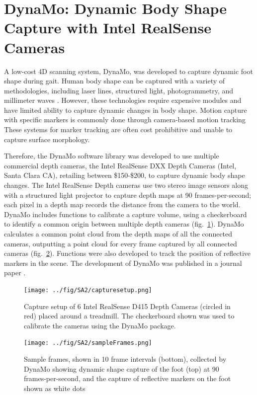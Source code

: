\documentclass[defaultstyle,11pt]{comps}
\begin{document}
\hypertarget{dynamo-dynamic-body-shape-capture-with-intel-realsense-cameras}{%
\section{DynaMo: Dynamic Body Shape Capture with Intel RealSense Cameras}\label{dynamo-dynamic-body-shape-capture-with-intel-realsense-cameras}}

A low-cost 4D scanning system, DynaMo, was developed to capture dynamic foot shape during gait.
Human body shape can be captured with a variety of methodologies, including laser lines, structured light, photogrammetry, and millimeter waves \citep{Daanen2013}.
However, these technologies require expensive modules and have limited ability to capture dynamic changes in body shape.
Motion capture with specific markers is commonly done through camera-based motion tracking \citep{Windolf2008}
These systems for marker tracking are often cost prohibitive and unable to capture surface morphology.

Therefore, the DynaMo software library was developed to use multiple commercial depth cameras, the Intel RealSense DXX Depth Cameras (Intel, Santa Clara CA), retailing between \$150-\$200, to capture dynamic body shape changes.
The Intel RealSense Depth cameras use two stereo image sensors along with a structured light projector to capture depth maps at 90 frames-per-second; each pixel in a depth map records the distance from the camera to the world.
DynaMo includes functions to calibrate a capture volume, using a checkerboard to identify a common origin between multiple depth cameras (fig.~\ref{fig:testSetup}).
DynaMo calculates a common point cloud from the depth maps of all the connected cameras, outputting a point cloud for every frame captured by all connected cameras (fig.~\ref{fig:SA2-sampleFrames}).
Functions were also developed to track the position of reflective markers in the scene.
The development of DynaMo was published in a journal paper \citep{Boppana2019}.

\begin{figure}
\hypertarget{fig:testSetup}{%
\centering
\texttt{[image: ../fig/SA2/capturesetup.png]}
\caption{Capture setup of 6 Intel RealSense D415 Depth Cameras (circled in red) placed around a treadmill. The checkerboard shown was used to calibrate the cameras using the DynaMo package.}\label{fig:testSetup}
}
\end{figure}

\begin{figure}
\hypertarget{fig:SA2-sampleFrames}{%
\centering
\texttt{[image: ../fig/SA2/sampleFrames.png]}
\caption{Sample frames, shown in 10 frame intervals (bottom), collected by DynaMo showing dynamic shape capture of the foot (top) at 90 frames-per-second, and the capture of reflective markers on the foot shown as white dots}\label{fig:SA2-sampleFrames}
}
\end{figure}
\end{document}
